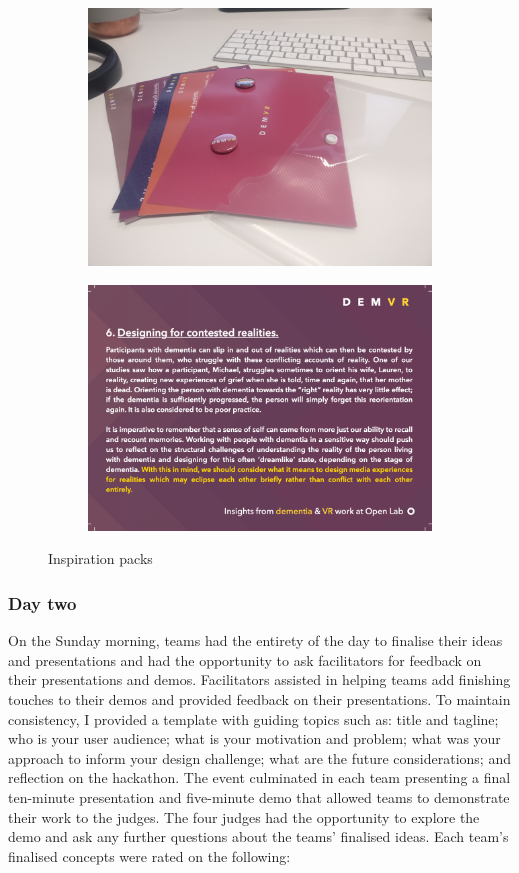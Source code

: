 \begin{figure}
\centering
\begin{subfigure}{.5\textwidth}
  \centering
  \includegraphics[width=.8\linewidth]{Images/DemVR/DemVRInspiration.jpeg}
  \label{fig:InspirationPackImage}
\end{subfigure}%
\begin{subfigure}{.5\textwidth}
  \centering
  \includegraphics[width=.8\linewidth]{Images/DemVR/InspirationCard.png}
  \label{fig:InspirationCard}
\end{subfigure}
\caption{Inspiration packs}
\label{fig:InspirationPacks}
\end{figure}

\subsubsection{Day two}
\label{DayTwo}
On the Sunday morning, teams had the entirety of the day to finalise their ideas and presentations and had the opportunity to ask facilitators for feedback on their presentations and demos. Facilitators assisted in helping teams add finishing touches to their demos and provided feedback on their presentations. To maintain consistency, I provided a template with guiding topics such as: title and tagline; who is your user audience; what is your motivation and problem; what was your approach to inform your design challenge; what are the future considerations; and reflection on the hackathon. The event culminated in each team presenting a final ten-minute presentation and five-minute demo that allowed teams to demonstrate their work to the judges. The four judges had the opportunity to explore the demo and ask any further questions about the teams' finalised ideas. Each team’s finalised concepts were rated on the following:

